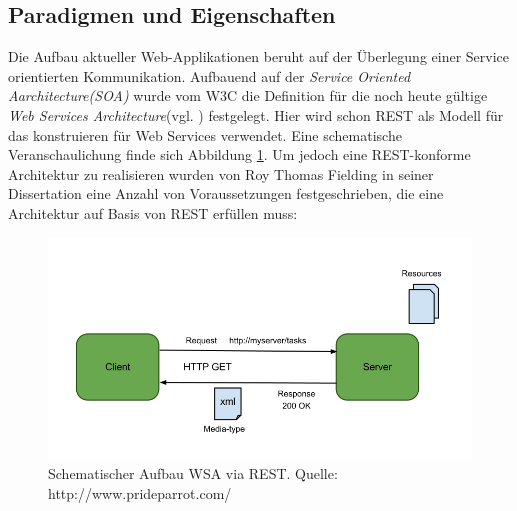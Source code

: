 \documentclass[fleqn,10pt,ngerman]{SelfArx}
\begin{document}
\subsection{Paradigmen und Eigenschaften}
Die Aufbau aktueller Web-Applikationen beruht auf der Überlegung einer Service orientierten Kommunikation. Aufbauend auf der \textit{Service Oriented Aarchitecture(SOA)} wurde vom W3C die Definition für die noch heute gültige \textit{Web Services Architecture}(vgl. \cite{WSA}) festgelegt. Hier wird schon REST als Modell für das konstruieren für Web Services verwendet. Eine schematische Veranschaulichung finde sich Abbildung \ref{fig:rest}. Um jedoch eine REST-konforme Architektur zu realisieren wurden von Roy Thomas Fielding in seiner Dissertation\cite{Fielding:2000} eine Anzahl von Voraussetzungen festgeschrieben, die eine Architektur auf Basis von REST erfüllen muss:
\begin{figure}[ht]\centering
	\includegraphics[width=9 cm]{Abbildungen/REST.png}
	\caption{Schematischer Aufbau WSA via REST. Quelle: http://www.prideparrot.com/}
	\label{fig:rest}
\end{figure}
\end{document}
